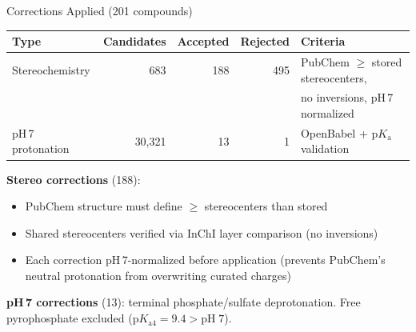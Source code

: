\documentclass[aspectratio=169,11pt]{beamer}
\begin{document}
\begin{frame}{Corrections Applied (201 compounds)}

\begin{table}[h]
\centering
\small
\begin{tabular}{lrrrl}
\toprule
\textbf{Type} & \textbf{Candidates} & \textbf{Accepted} & \textbf{Rejected} & \textbf{Criteria} \\
\midrule
Stereochemistry  & 683 & 188 & 495 & PubChem $\geq$ stored stereocenters, \\
                 &     &     &     & no inversions, pH\,7 normalized \\[4pt]
pH\,7 protonation & 30,321 & 13 & 1 & OpenBabel + $\text{p}K_\text{a}$ validation \\
\bottomrule
\end{tabular}
\end{table}

\bigskip
\textbf{Stereo corrections} (188):
\begin{itemize}\setlength\itemsep{1pt}
  \item PubChem structure must define $\geq$ stereocenters than stored
  \item Shared stereocenters verified via InChI layer comparison (no inversions)
  \item Each correction pH\,7-normalized before application
        (prevents PubChem's neutral protonation from overwriting curated charges)
\end{itemize}

\medskip
\textbf{pH\,7 corrections} (13): terminal phosphate/sulfate deprotonation.
Free pyrophosphate excluded ($\text{p}K_{\text{a}4}{=}9.4 > \text{pH}\;7$).

\end{frame}
\end{document}
